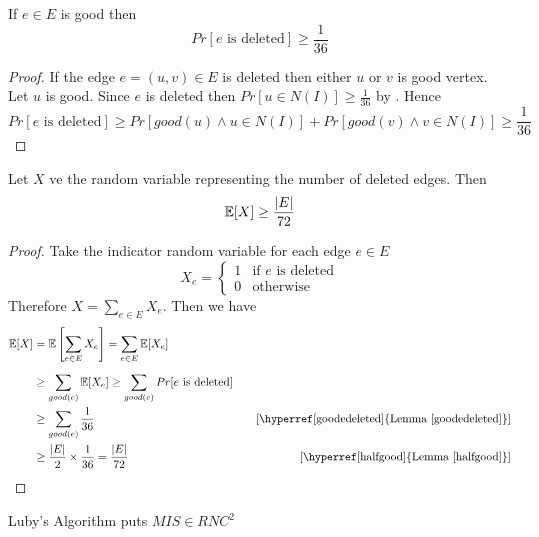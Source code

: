 \begin{lemma}\label{goodedeleted}
	If $e\in E$ is good then $$Pr[\text{$e$ is deleted}]\geq \frac1{36}$$
\end{lemma}
\begin{proof}
	If the edge $e=(u,v)\in E$ is deleted then either $u$ or $v$ is good vertex. Let $u$ is good. Since $e$ is deleted then $Pr[u\in N(I)]\geq \frac1{36}$ by . Hence $$Pr[\text{$e$ is deleted}]\geq Pr[good(u)\wedge u\in N(I)] + Pr[good(v)\wedge v\in N(I)]\geq \frac1{36}$$
\end{proof}

\begin{lemma}\label{edgedeleted}
	Let $X$ ve the random variable representing the number of deleted edges. Then $$\mathbb{E}[X]\geq \frac{|E|}{72}$$
\end{lemma}
\begin{proof}
	Take the indicator random variable for each edge $e\in E$ $$X_e=\begin{cases}
		1& \text{if $e$ is deleted}\\ 0 &\text{otherwise}
	\end{cases}$$
	Therefore $X=\sum\limits_{e\in E}X_e$. Then we have \begin{align*}
		\bbE[X] & = \bbE\lt[ \sum_{e\in E}X_e \rt] = \sum_{e\in E}\bbE[X_e]\\[2mm]
		& \geq \sum_{good(e)}\bbE[X_e]\geq \sum_{good(e)}Pr[\text{$e$ is deleted}]\\ 
		& \geq \sum_{good(e)}\frac1{36} &\quad [\text{\hyperref[goodedeleted]{Lemma \ref{goodedeleted}}}]\\
		& \geq \frac{|E|}{2}\times \frac1{36}=\frac{|E|}{72}&\quad [\text{\hyperref[halfgood]{Lemma \ref{halfgood}}}]
	\end{align*}
\end{proof}

\begin{theorem}
	Luby's Algorithm puts $MIS\in RNC^2$
\end{theorem}